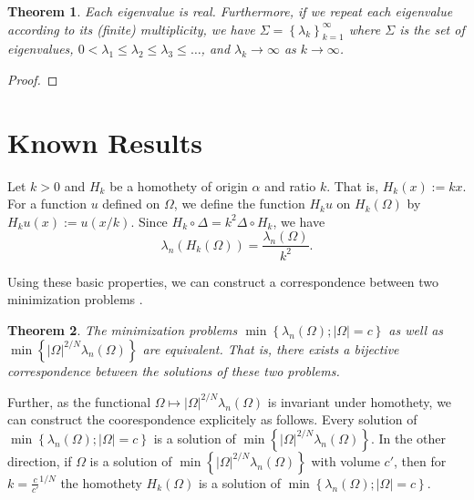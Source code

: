 \documentclass[12pt]{report}
\newtheorem{theorem}{Theorem}[section]
\numberwithin{definition}{section}
\begin{document}
\begin{theorem}
  Each eigenvalue is real.
  Furthermore, if we repeat each eigenvalue according to its (finite) multiplicity, we have
    $\Sigma = \left\{ \lambda_{k} \right\}_{k=1}^\infty$ 
    where $\Sigma$ is the set of eigenvalues, 
    $0 < \lambda_1 \leq \lambda_2 \leq \lambda_3 \leq \ldots$,
    and $\lambda_{k} \to \infty$ as $k \to \infty$.
    
\end{theorem}

\begin{proof}
\end{proof}

\break

\section{Known Results}




Let $k > 0$ and $H_{k}$ be a homothety of origin $\alpha$ and ratio $k$.
That is, $H_{k}(x) := kx$.
For a function $u$ defined on  $\Omega$, we define the function $H_{k}u$ on $H_{k}(\Omega)$ by $H_{k}u(x) := u(x/k)$.
Since $H_{k} \circ \Delta = k^2 \Delta \circ H_{k}$, we have
\[
\lambda_{n}(H_{k}(\Omega)) = \frac{\lambda_{n}(\Omega)}{k^2}
.\] 

Using these basic properties, we can construct a correspondence between two minimization problems \cite{henrot}.

\begin{theorem} \label{eqmin}
The minimization problems $\min \left\{ \lambda_{n}(\Omega); |\Omega| = c \right\} $ as well as $\min \left\{ |\Omega|^{2/N}  \lambda_{n}(\Omega) \right\} $ are equivalent.
That is, there exists a bijective correspondence between the solutions of these two problems.
\end{theorem}

Further, as the functional $\Omega \mapsto | \Omega |^{2 / N} \lambda_{n}(\Omega) $ is invariant under homothety, we can construct the coorespondence explicitely as follows.
Every solution of $\min \left\{ \lambda_{n}(\Omega); |\Omega| = c \right\} $ is a solution of $\min \left\{ |\Omega|^{2/N}  \lambda_{n}(\Omega) \right\} $.
In the other direction, if $\Omega$ is a solution of $\min \left\{ |\Omega|^{2/N}  \lambda_{n}(\Omega) \right\} $ with volume $c'$, then for $k = \frac{c}{c'}^{1 / N}$ the homothety $H_{k}(\Omega)$ is a solution of $\min \left\{ \lambda_{n}(\Omega); |\Omega| = c \right\} $.
\end{document}
